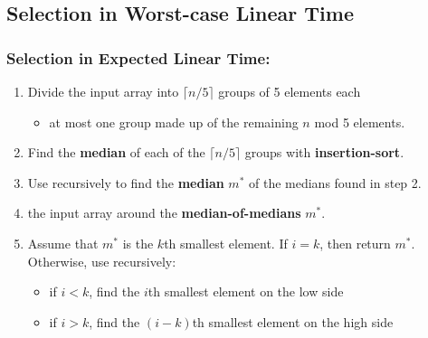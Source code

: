 \documentclass[UTF8,11pt,handout]{beamer}
\begin{document}
\subsection{Selection in Worst-case Linear Time}
\begin{frame}
\frametitle{Selection in Expected Linear Time:   }

\begin{block}{}
	\begin{center}
\begin{enumerate}
	\item Divide the input array into {\color{blue}$\lceil n/5 \rceil$} groups of 5 elements each 
		\begin{itemize}
			\item at most one group made up of the remaining $n$ mod 5 elements. 
		\end{itemize} 
	\item Find the \textbf{median} of each of the {\color{blue}$\lceil n/5 \rceil$} groups with \textbf{insertion-sort}. 
	\item  Use  recursively to find the \textbf{median} {\color{blue}$m^*$} of the medians found in step 2.  
	\item \textbf{\color{red}} the input array around the \textbf{median-of-medians} $m^*$. 
	\item  Assume that {\color{blue}$m^*$} is the $k$th smallest element. If $i=k$, then return $m^*$. Otherwise, use 
 recursively: 
	\begin{itemize}
		\item if $i<k$, find the $i$th smallest element on the low side
		\item if $i>k$, find the $(i-k)$th smallest element on the high side
	\end{itemize}
\end{enumerate}
	\end{center}
\end{block}
\end{frame}
\end{document}
